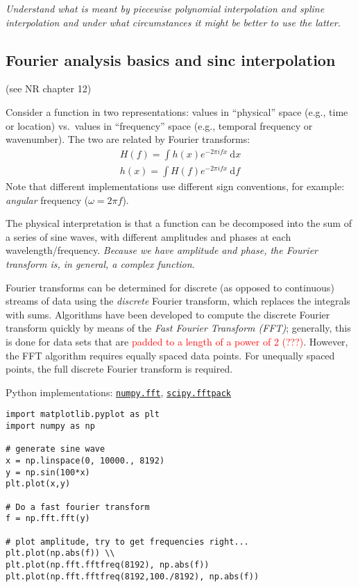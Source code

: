 \documentclass{article}
\newcommand{\test}[1]{%
    \begin{center}
        \colorbox{hl}{\parbox{0.9\textwidth}{\emph{#1}}}
    \end{center}}
\begin{document}
\test{Understand what is meant by piecewise polynomial interpolation and
spline interpolation and under what circumstances it might be better to use
the latter.}

\subsection{Fourier analysis basics and sinc interpolation}
(see NR chapter 12)

Consider a function in two representations: values in
``physical'' space (e.g., time or location) vs.\ values in ``frequency'' space
(e.g., temporal frequency or wavenumber). The two are related by Fourier
transforms:
\begin{align*}
    H(f) = \int \! h(x)e^{-2\pi ifx}\ \textrm{d}x\\
    h(x) = \int\! H(f)e^{-2\pi ifx}\ \textrm{d}f
\end{align*}
Note that different implementations use different sign conventions,
for example: \emph{angular} frequency ($\omega = 2\pi f$).

The physical interpretation is that a function can be decomposed into the sum
of a series of sine waves, with different amplitudes and phases at each
wavelength/frequency. \emph{Because we have amplitude and phase, the Fourier
transform is, in general, a complex function}.

Fourier transforms can be determined for discrete (as opposed to continuous)
streams of data using the \emph{discrete} Fourier transform, which replaces the
integrals with sums. Algorithms have been developed to compute the discrete
Fourier transform quickly by means of the \emph{Fast Fourier Transform (FFT)};
generally, this is done for data sets that are \textcolor{red}
{padded to a length of a power of 2 (???)}.
However, the FFT algorithm requires equally spaced data points. For
unequally spaced points, the full discrete Fourier transform is required.

Python implementations:
\href{http://docs.scipy.org/doc/numpy/reference/routines.fft.html}
{\tt numpy.fft},
\href{http://docs.scipy.org/doc/scipy/reference/tutorial/fftpack.html}
{\tt scipy.fftpack}

\begin{verbatim}
import matplotlib.pyplot as plt
import numpy as np

# generate sine wave
x = np.linspace(0, 10000., 8192)
y = np.sin(100*x)
plt.plot(x,y)

# Do a fast fourier transform
f = np.fft.fft(y)

# plot amplitude, try to get frequencies right...
plt.plot(np.abs(f)) \\
plt.plot(np.fft.fftfreq(8192), np.abs(f))
plt.plot(np.fft.fftfreq(8192,100./8192), np.abs(f))
\end{verbatim}
\end{document}
